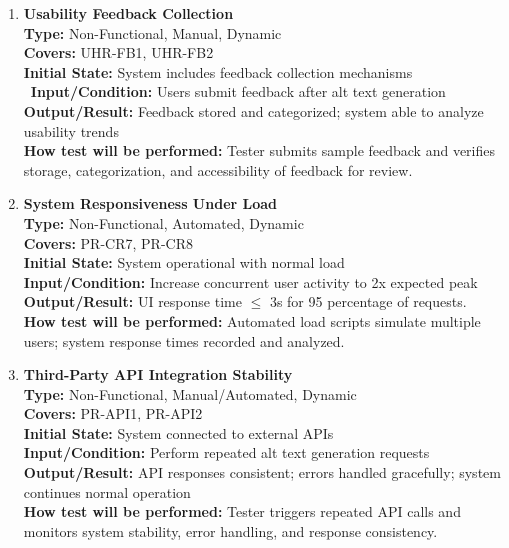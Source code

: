 \documentclass[12pt, titlepage]{article}
\begin{document}
\begin{enumerate}[label=NFR-ST \arabic*., wide=0pt, leftmargin=*]
  \item \textbf{Usability Feedback Collection} \\[2mm]
    \textbf{Type:} Non-Functional, Manual, Dynamic \\
    \textbf{Covers:} UHR-FB1, UHR-FB2 \\
    \textbf{Initial State:} System includes feedback collection mechanisms \
    \textbf{Input/Condition:} Users submit feedback after alt text generation \\
    \textbf{Output/Result:} Feedback stored and categorized; system
    able to analyze usability trends \\[2mm]
    \textbf{How test will be performed:} Tester submits sample
    feedback and verifies storage, categorization, and accessibility
    of feedback for review.

  \item \textbf{System Responsiveness Under Load} \\[2mm]
    \textbf{Type:} Non-Functional, Automated, Dynamic \\
    \textbf{Covers:} PR-CR7, PR-CR8 \\
    \textbf{Initial State:} System operational with normal load \\
    \textbf{Input/Condition:} Increase concurrent user activity to 2x
    expected peak \\
    \textbf{Output/Result:} UI response time $\le$ 3s for 95 percentage of requests. \\[2mm]
    \textbf{How test will be performed:} Automated load scripts
    simulate multiple users; system response times recorded and analyzed.

  \item \textbf{Third-Party API Integration Stability} \\[2mm]
    \textbf{Type:} Non-Functional, Manual/Automated, Dynamic \\
    \textbf{Covers:} PR-API1, PR-API2 \\
    \textbf{Initial State:} System connected to external APIs \\
    \textbf{Input/Condition:} Perform repeated alt text generation requests \\
    \textbf{Output/Result:} API responses consistent; errors handled
    gracefully; system continues normal operation \\[2mm]
    \textbf{How test will be performed:} Tester triggers repeated API
    calls and monitors system stability, error handling, and response
    consistency.


\end{enumerate}
\end{document}
